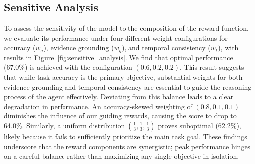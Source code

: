 \documentclass{article} %
\begin{document}
\subsection{Sensitive Analysis}
\label{sec:sensitive_analysis}
To assess the sensitivity of the model to the composition of the reward function, we evaluate its performance under four different weight configurations for accuracy ($w_a$), evidence grounding ($w_g$), and temporal consistency ($w_t$), with results in Figure~\ref{fig:sensitive_analysis}. We find that optimal performance (67.0\%) is achieved with the configuration $(0.6, 0.2, 0.2)$. This result suggests that while task accuracy is the primary objective, substantial weights for both evidence grounding and temporal consistency are essential to guide the reasoning process of the agent effectively. Deviating from this balance leads to a clear degradation in performance. An accuracy-skewed weighting of $(0.8, 0.1, 0.1)$ diminishes the influence of our guiding rewards, causing the score to drop to 64.0\%. Similarly, a uniform distribution $(\tfrac{1}{3}, \tfrac{1}{3}, \tfrac{1}{3})$ proves suboptimal (62.2\%), likely because it fails to sufficiently prioritize the main task goal. These findings underscore that the reward components are synergistic; peak performance hinges on a careful balance rather than maximizing any single objective in isolation.
\end{document}
